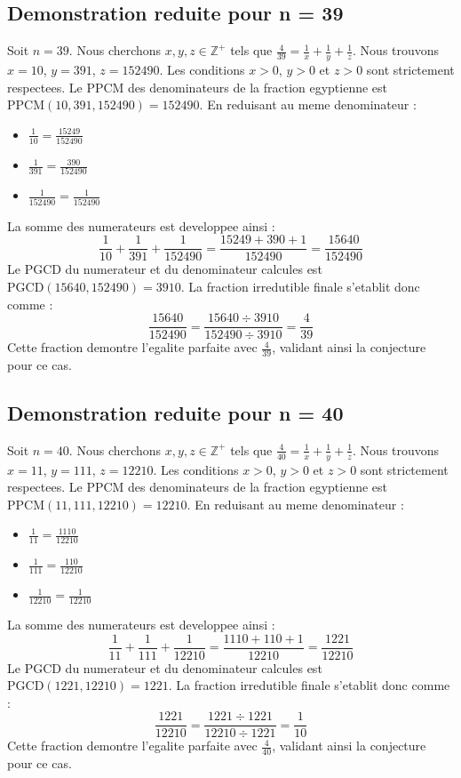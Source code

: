 \documentclass[11pt,a4paper]{article}
\begin{document}
\subsection{Demonstration reduite pour n = 39}
Soit $n = 39$. Nous cherchons $x, y, z \in \mathbb{Z}^{+}$ tels que $\frac{4}{39} = \frac{1}{x} + \frac{1}{y} + \frac{1}{z}$.
Nous trouvons $x = 10$, $y = 391$, $z = 152490$.
Les conditions $x > 0$, $y > 0$ et $z > 0$ sont strictement respectees.
Le PPCM des denominateurs de la fraction egyptienne est $\text{PPCM}(10, 391, 152490) = 152490$.
En reduisant au meme denominateur :
\begin{itemize}
    \item $\frac{1}{10} = \frac{15249}{152490}$
    \item $\frac{1}{391} = \frac{390}{152490}$
    \item $\frac{1}{152490} = \frac{1}{152490}$
\end{itemize}
La somme des numerateurs est developpee ainsi :
$$ \frac{1}{10} + \frac{1}{391} + \frac{1}{152490} = \frac{15249 + 390 + 1}{152490} = \frac{15640}{152490} $$
Le PGCD du numerateur et du denominateur calcules est $\text{PGCD}(15640, 152490) = 3910$.
La fraction irredutible finale s'etablit donc comme :
$$ \frac{15640}{152490} = \frac{15640 \div 3910}{152490 \div 3910} = \frac{4}{39} $$
Cette fraction demontre l'egalite parfaite avec $\frac{4}{39}$, validant ainsi la conjecture pour ce cas.

\subsection{Demonstration reduite pour n = 40}
Soit $n = 40$. Nous cherchons $x, y, z \in \mathbb{Z}^{+}$ tels que $\frac{4}{40} = \frac{1}{x} + \frac{1}{y} + \frac{1}{z}$.
Nous trouvons $x = 11$, $y = 111$, $z = 12210$.
Les conditions $x > 0$, $y > 0$ et $z > 0$ sont strictement respectees.
Le PPCM des denominateurs de la fraction egyptienne est $\text{PPCM}(11, 111, 12210) = 12210$.
En reduisant au meme denominateur :
\begin{itemize}
    \item $\frac{1}{11} = \frac{1110}{12210}$
    \item $\frac{1}{111} = \frac{110}{12210}$
    \item $\frac{1}{12210} = \frac{1}{12210}$
\end{itemize}
La somme des numerateurs est developpee ainsi :
$$ \frac{1}{11} + \frac{1}{111} + \frac{1}{12210} = \frac{1110 + 110 + 1}{12210} = \frac{1221}{12210} $$
Le PGCD du numerateur et du denominateur calcules est $\text{PGCD}(1221, 12210) = 1221$.
La fraction irredutible finale s'etablit donc comme :
$$ \frac{1221}{12210} = \frac{1221 \div 1221}{12210 \div 1221} = \frac{1}{10} $$
Cette fraction demontre l'egalite parfaite avec $\frac{4}{40}$, validant ainsi la conjecture pour ce cas.
\end{document}
